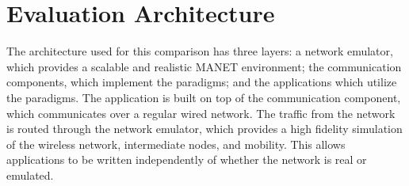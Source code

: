 \documentclass[lnicst]{svmultln}
\begin{document}





\section{Evaluation Architecture}

The architecture used for this comparison has three layers: a network emulator, which provides a scalable and realistic MANET environment; the communication components, which implement the paradigms; and the applications which utilize the paradigms. The application is built on top of the communication component, which communicates over a regular wired network. The traffic from the network is routed through the network emulator, which provides a high fidelity simulation of the wireless network, intermediate nodes, and mobility. This allows applications to be written independently of whether the network is real or emulated.
\end{document}
